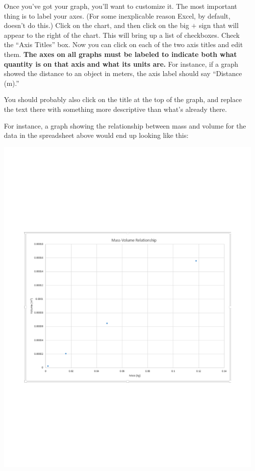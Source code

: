 Once you've got your graph, you'll
want to customize it. The most important thing is to label your axes.
(For some inexplicable reason Excel, by default, doesn't do this.)
Click on the chart, and then click on the big $+$ sign
that will appear to the right of the chart. This will bring
up a list of checkboxes. Check the ``Axis Titles'' box.
Now you can click on each of the two axis titles and edit them.
\textbf{The axes on all graphs must be labeled to indicate both
what quantity is on that axis and what its units are.} For instance,
if a graph showed the distance to an object in meters, the
axis label should say ``Distance (m).''

You should probably also click on the title at the top of the graph,
and replace the text there with something more descriptive than
what's already there. 

For instance, a graph showing the relationship between mass and volume
for the data in the spreadsheet above would end up looking like this:

\centerline{\includegraphics[width=6in]{appendices/excel/excelgraph.pdf}}


